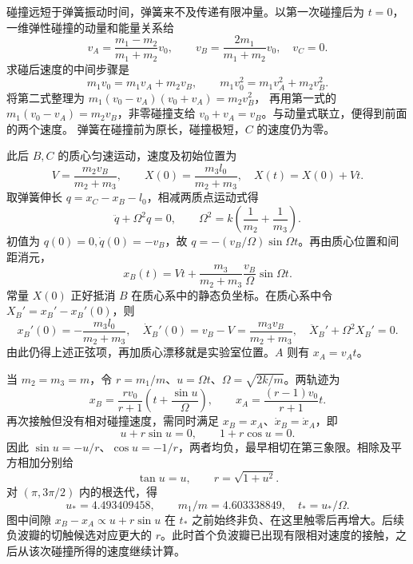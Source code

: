 \documentclass[UTF8,fontset=fandol,a4paper,11pt]{ctexart}
\newcommand{\figcaption}[1]{\par\vspace{2pt}{\small\color{muted}#1}\par}
\begin{document}
碰撞远短于弹簧振动时间，弹簧来不及传递有限冲量。以第一次碰撞后为 $t=0$，一维弹性碰撞的动量和能量关系给
\[v_A=\frac{m_1-m_2}{m_1+m_2}v_0,\qquad
v_B=\frac{2m_1}{m_1+m_2}v_0,\quad v_C=0.\]
求碰后速度的中间步骤是
\[
 m_1v_0=m_1v_A+m_2v_B,\qquad
 m_1v_0^2=m_1v_A^2+m_2v_B^2.
\]
将第二式整理为 $m_1(v_0-v_A)(v_0+v_A)=m_2v_B^2$，
再用第一式的 $m_1(v_0-v_A)=m_2v_B$，非零碰撞支给
$v_0+v_A=v_B$。与动量式联立，便得到前面的两个速度。
弹簧在碰撞前为原长，碰撞极短，$C$ 的速度仍为零。

此后 $B,C$ 的质心匀速运动，速度及初始位置为
\[V=\frac{m_2v_B}{m_2+m_3},\qquad
X(0)=\frac{m_3l_0}{m_2+m_3},\quad X(t)=X(0)+Vt.\]
取弹簧伸长 $q=x_C-x_B-l_0$，相减两质点运动式得
\[\ddot q+\Omega^2q=0,\qquad
\Omega^2=k\left(\frac1{m_2}+\frac1{m_3}\right).\]
初值为 $q(0)=0,\dot q(0)=-v_B$，故 $q=-(v_B/\Omega)\sin\Omega t$。再由质心位置和间距消元，
\[\boxed{x_B(t)=Vt+\frac{m_3}{m_2+m_3}\frac{v_B}{\Omega}\sin\Omega t.}\]
常量 $X(0)$ 正好抵消 $B$ 在质心系中的静态负坐标。在质心系中令 $X_B'=x_B'-x_B'(0)$，则
\[x_B'(0)=-\frac{m_3l_0}{m_2+m_3},\quad
\dot X_B'(0)=v_B-V=\frac{m_3v_B}{m_2+m_3},\quad
\ddot X_B'+\Omega^2X_B'=0.\]
由此仍得上述正弦项，再加质心漂移就是实验室位置。$A$ 则有 $x_A=v_At$。
\begin{center}\begin{minipage}{\linewidth}\centering{}\figcaption{解图 7.23B}\end{minipage}\end{center}
当 $m_2=m_3=m$，令 $r=m_1/m$、$u=\Omega t$、$\Omega=\sqrt{2k/m}$。两轨迹为
\[x_B=\frac{rv_0}{r+1}\left(t+\frac{\sin u}{\Omega}\right),
\qquad x_A=\frac{(r-1)v_0}{r+1}t.\]
再次接触但没有相对碰撞速度，需同时满足 $x_B=x_A$、$\dot x_B=\dot x_A$，即
\[u+r\sin u=0,\qquad 1+r\cos u=0.\]
因此 $\sin u=-u/r$、$\cos u=-1/r$，两者均负，最早相切在第三象限。相除及平方相加分别给
\[\tan u=u,\qquad r=\sqrt{1+u^2}.\]
对 $(\pi,3\pi/2)$ 内的根迭代，得
\[u_*=4.493409458,\qquad
\boxed{m_1/m=4.603338849,\quad t_*=u_*/\Omega.}\]
图中间隙 $x_B-x_A\propto u+r\sin u$ 在 $t_*$ 之前始终非负、在这里触零后再增大。后续负波瓣的切触候选对应更大的 $r$。此时首个负波瓣已出现有限相对速度的接触，之后从该次碰撞所得的速度继续计算。
\end{document}
